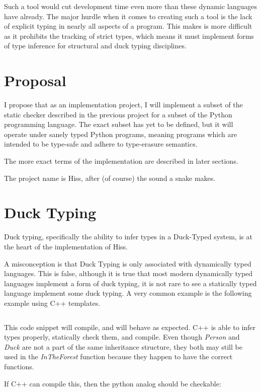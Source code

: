 \documentclass{article}
\begin{document}
\begin{multicols}{2}
Such a tool would cut development time even more than these dynamic languages
have already. The major hurdle when it comes to creating such a tool is
the lack of explicit typing in nearly all aspects of a program. This makes is
more difficult as it prohibits the tracking of strict types, which means
it must implement forms of type inference for structural and duck typing
disciplines.

\section*{Proposal}

I propose that as an implementation project, I will implement a subset of the
static checker described in the previous project for a subset of the Python
programming language. The exact subset has yet to be defined, but it will
operate under sanely typed Python programs, meaning programs which are intended
to be type-safe and adhere to type-erasure semantics.

The more exact terms of the implementation are described in later sections.

The project name is Hiss, after (of course) the sound a snake makes.

\section*{Duck Typing}

Duck typing, specifically the ability to infer types in a Duck-Typed system,
is at the heart of the implementation of Hiss.

A misconception is that Duck Typing is only associated with dynamically typed
languages. This is false, although it is true that most modern dynamically typed
languages implement a form of duck typing, it is not rare to see a statically
typed language implement some duck typing. A very common example is the following
example using C++ templates.

\inputminted{cpp}{test1.cpp}

This code snippet will compile, and will behave as expected. C++ is able
to infer types properly, statically check them, and compile. Even though
\emph{Person} and \emph{Duck} are not a part of the same inheritance structure,
they both may still be used in the \emph{InTheForest} function because they
happen to have the correct functions.

If C++ can compile this, then the python analog should be checkable:


\end{multicols}
\end{document}
